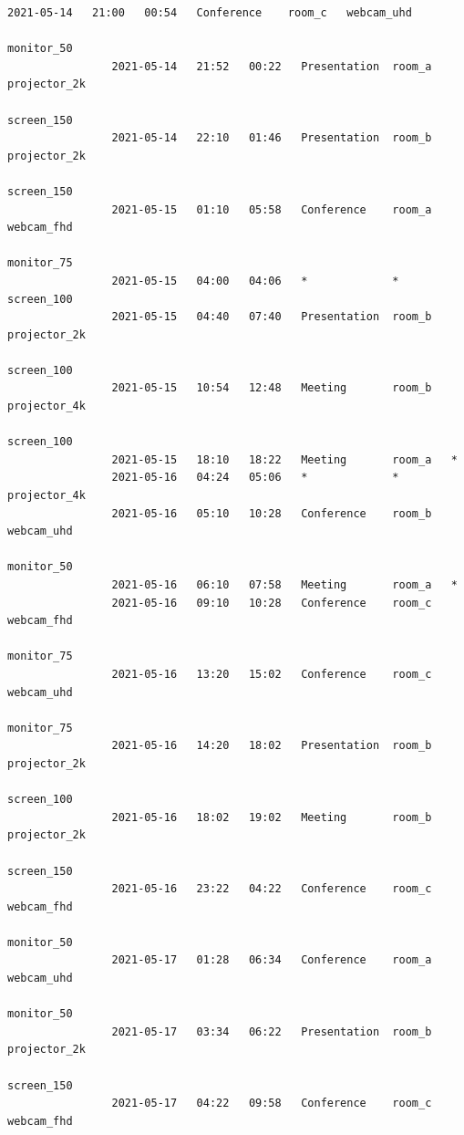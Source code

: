 \documentclass{article}
\begin{document}
\begin{Verbatim}[gobble=8]
                2021-05-14   21:00   00:54   Conference    room_c   webcam_uhd
                                                                    monitor_50
                2021-05-14   21:52   00:22   Presentation  room_a   projector_2k
                                                                    screen_150
                2021-05-14   22:10   01:46   Presentation  room_b   projector_2k
                                                                    screen_150
                2021-05-15   01:10   05:58   Conference    room_a   webcam_fhd
                                                                    monitor_75
                2021-05-15   04:00   04:06   *             *        screen_100
                2021-05-15   04:40   07:40   Presentation  room_b   projector_2k
                                                                    screen_100
                2021-05-15   10:54   12:48   Meeting       room_b   projector_4k
                                                                    screen_100
                2021-05-15   18:10   18:22   Meeting       room_a   *
                2021-05-16   04:24   05:06   *             *        projector_4k
                2021-05-16   05:10   10:28   Conference    room_b   webcam_uhd
                                                                    monitor_50
                2021-05-16   06:10   07:58   Meeting       room_a   *
                2021-05-16   09:10   10:28   Conference    room_c   webcam_fhd
                                                                    monitor_75
                2021-05-16   13:20   15:02   Conference    room_c   webcam_uhd
                                                                    monitor_75
                2021-05-16   14:20   18:02   Presentation  room_b   projector_2k
                                                                    screen_100
                2021-05-16   18:02   19:02   Meeting       room_b   projector_2k
                                                                    screen_150
                2021-05-16   23:22   04:22   Conference    room_c   webcam_fhd
                                                                    monitor_50
                2021-05-17   01:28   06:34   Conference    room_a   webcam_uhd
                                                                    monitor_50
                2021-05-17   03:34   06:22   Presentation  room_b   projector_2k
                                                                    screen_150
                2021-05-17   04:22   09:58   Conference    room_c   webcam_fhd

\end{Verbatim}
\end{document}
